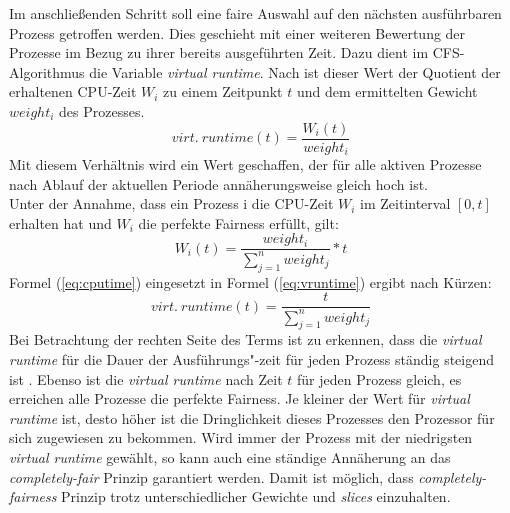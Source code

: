 Im anschließenden Schritt soll eine faire Auswahl auf den nächsten ausführbaren Prozess getroffen werden. Dies geschieht mit einer weiteren Bewertung der Prozesse im Bezug zu ihrer bereits ausgeführten Zeit. Dazu dient im CFS-Algorithmus die Variable \textit{virtual runtime}. Nach \cite{usenix} ist dieser Wert der Quotient der erhaltenen CPU-Zeit $W_{i}$ zu einem Zeitpunkt $t$ und dem ermittelten Gewicht \textit{$weight_{i}$} des Prozesses.
\begin{equation}
virt. \ runtime(t) = \frac{W_{i}(t)}{weight_{i}}
\label{eq:vruntime}
\end{equation}
Mit diesem Verhältnis wird ein Wert geschaffen, der für alle aktiven Prozesse nach Ablauf der aktuellen Periode annäherungs\-weise gleich hoch ist.\\
Unter der Annahme, dass ein Prozess i die CPU-Zeit $W_{i}$ im Zeitinterval $[0,t]$ erhalten hat und $W_{i}$ die perfekte Fairness erfüllt, gilt:
\begin{equation}
W_{i}(t) = \frac{weight_{i}}{\sum_{j=1}^{n} weight_j} * t
\label{eq:cputime}
\end{equation}
Formel (\ref{eq:cputime}) eingesetzt in Formel (\ref{eq:vruntime}) ergibt nach Kürzen:
\begin{equation}
virt. \ runtime(t) = \frac{t}{\sum_{j=1}^{n} weight_j}
\label{eq:vruntime2}
\end{equation}
Bei Betrachtung der rechten Seite des Terms ist zu erkennen, dass die \textit{virtual runtime} für die Dauer der Ausführungs"-zeit für jeden Prozess ständig steigend ist \cite{rlove}. Ebenso ist die \textit{virtual runtime} nach Zeit $t$ für jeden Prozess gleich, es erreichen alle Prozesse die perfekte Fairness. 
Je kleiner der Wert für \textit{virtual runtime} ist, desto höher ist die Dringlichkeit dieses Prozesses den Prozessor für sich zugewiesen zu bekommen. 
Wird immer der Prozess mit der niedrigsten \textit{virtual runtime} gewählt, so kann auch eine ständige An\-nähe\-rung an das \textit{completely-fair} Prinzip garantiert werden. 
Damit ist möglich, dass \textit{completely-fairness} Prinzip trotz unterschiedlicher Gewichte und \textit{slices} einzuhalten.

